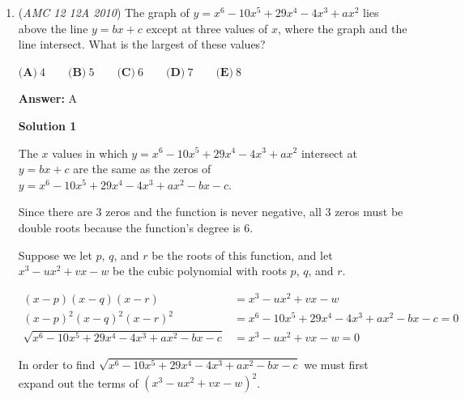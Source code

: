 \begin{enumerate}
 
$b_n = 1 + i(n-1)$

 
Subtracting one from all the possible values listed above for $a_n$ and $b_n$, we get

 
$k(n-1) = 1, 2, 4, 5, 9, 14, 29$

 
and

 
$i(n-1) = 1004, 669, 401, 334, 200, 133, 66$

 
In order to maximize $n$, we must maximize $n-1$. Therefore $k$ and $i$ are \href{https://artofproblemsolving.com/wiki/index.php?title=Coprime}{coprime} and $n-1$ is the \href{https://artofproblemsolving.com/wiki/index.php?title=Greatest\_common\_factor}{GCF} of any corresponding pair. Inspecting all of the pairs, we see that the \href{https://artofproblemsolving.com/wiki/index.php?title=Greatest\_common\_factor}{GCF} is always $1$ except for the pair $(14, 133),$ which has a GCF of $7$. Therefore the maximum value of $n$ is $8 \Rightarrow \boxed{\text{C}}$.

 


	\item (\textit{AMC 12 12A 2010}) The graph of $y=x^6-10x^5+29x^4-4x^3+ax^2$ lies above the line $y=bx+c$ except at three values of $x$, where the graph and the line intersect. What is the largest of these values?


 $\textbf{(A)}\ 4 \qquad \textbf{(B)}\ 5 \qquad \textbf{(C)}\ 6 \qquad \textbf{(D)}\ 7 \qquad \textbf{(E)}\ 8$

 \textbf{Answer: }A



\textbf{Solution 1}

The $x$ values in which $y=x^6-10x^5+29x^4-4x^3+ax^2$ intersect at $y=bx+c$ are the same as the zeros of $y=x^6-10x^5+29x^4-4x^3+ax^2-bx-c$.

 Since there are $3$ zeros and the function is never negative, all $3$ zeros must be double roots because the function's degree is $6$.

 Suppose we let $p$, $q$, and $r$ be the roots of this function, and let $x^3-ux^2+vx-w$ be the cubic polynomial with roots $p$, $q$, and $r$.

 
 \begin{align*}(x-p)(x-q)(x-r) &= x^3-ux^2+vx-w\\ (x-p)^2(x-q)^2(x-r)^2 &= x^6-10x^5+29x^4-4x^3+ax^2-bx-c = 0\\ \sqrt{x^6-10x^5+29x^4-4x^3+ax^2-bx-c} &= x^3-ux^2+vx-w = 0\end{align*}


 In order to find $\sqrt{x^6-10x^5+29x^4-4x^3+ax^2-bx-c}$ we must first expand out the terms of $(x^3-ux^2+vx-w)^2$.


\end{enumerate}
